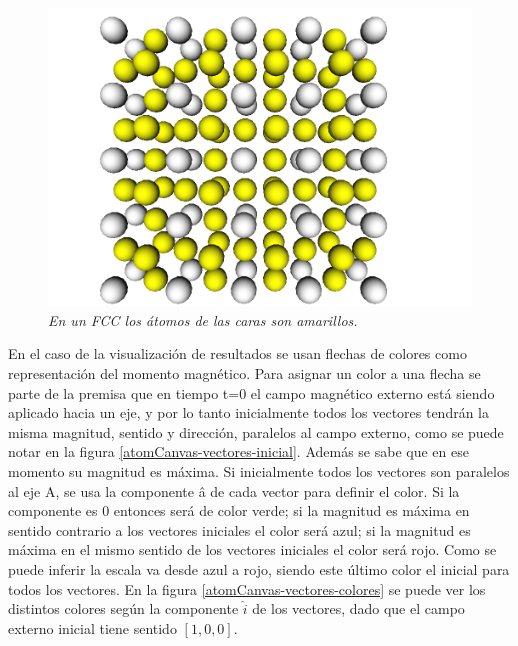 \begin{figure}[ht]
  \centering
  \includegraphics[scale=.35]{images/atomCanvas-FCC}
  \caption{\em En un FCC los átomos de las caras son amarillos.}
  \label{atomCanvas-FCC}
\end{figure}

En el caso de la visualización de resultados se usan flechas de colores como representación del momento magnético. Para asignar un color a una flecha se parte de la premisa que en tiempo t=0 el campo magnético externo está siendo aplicado hacia un eje, y por lo tanto inicialmente todos los vectores tendrán la misma magnitud, sentido y dirección, paralelos al campo externo, como se puede notar en la figura \ref{atomCanvas-vectores-inicial}. Además se sabe que en ese momento su magnitud es máxima. Si inicialmente todos los vectores son paralelos al eje A, se usa la componente â de cada vector para definir el color. Si la componente es 0 entonces será de color verde; si la magnitud es máxima en sentido contrario a los vectores iniciales el color será azul; si la magnitud es máxima en el mismo sentido de los vectores iniciales el color será rojo. Como se puede inferir la escala va desde azul a rojo, siendo este último color el inicial para todos los vectores. En la figura \ref{atomCanvas-vectores-colores} se puede ver los distintos colores según la componente $\hat{i}$ de los vectores, dado que el campo externo inicial tiene sentido $[1, 0, 0]$.

